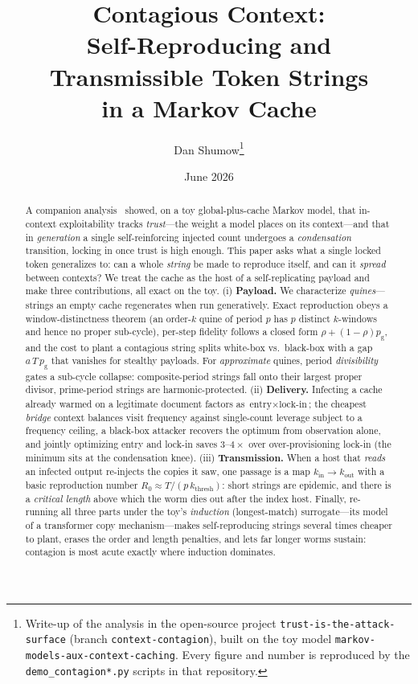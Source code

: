 \documentclass[11pt]{article}
\title{\bfseries Contagious Context:\\[2pt]
Self-Reproducing and Transmissible Token Strings\\
in a Markov Cache}
\author{Dan Shumow\thanks{Write-up of the analysis in the open-source project
\texttt{trust-is-the-attack-surface} (branch \texttt{context-contagion}), built on the toy
model \texttt{markov-models-aux-context-caching}. Every figure and number is reproduced by
the \texttt{demo\_contagion*.py} scripts in that repository.}}
\date{June 2026}
\theoremstyle{plain}
\theoremstyle{definition}
\theoremstyle{remark}
\newcommand{\pg}{p_{\text{g}}}
\newcommand{\Rzero}{R_{0}}
\begin{document}
\maketitle

\begin{abstract}
A companion analysis~\cite{shumow2026trust} showed, on a toy global-plus-cache Markov
model, that in-context exploitability tracks \emph{trust}---the weight a model places on its
context---and that in \emph{generation} a single self-reinforcing injected count undergoes a
\emph{condensation} transition, locking in once trust is high enough. This paper asks what a
single locked token generalizes to: can a whole \emph{string} be made to reproduce itself,
and can it \emph{spread} between contexts? We treat the cache as the host of a self-replicating
payload and make three contributions, all exact on the toy. (i) \textbf{Payload.} We
characterize \emph{quines}---strings an empty cache regenerates when run generatively. Exact
reproduction obeys a window-distinctness theorem (an order-$k$ quine of period $p$ has $p$
distinct $k$-windows and hence no proper sub-cycle), per-step fidelity follows a closed form
$\rho+(1-\rho)\pg$, and the cost to plant a contagious string splits white-box vs.\ black-box
with a gap $a\,T\,\pg$ that vanishes for stealthy payloads. For \emph{approximate} quines,
period \emph{divisibility} gates a sub-cycle collapse: composite-period strings fall onto
their largest proper divisor, prime-period strings are harmonic-protected. (ii)
\textbf{Delivery.} Infecting a cache already warmed on a legitimate document factors as
$\text{entry}\times\text{lock-in}$; the cheapest \emph{bridge} context balances visit
frequency against single-count leverage subject to a frequency ceiling, a black-box attacker
recovers the optimum from observation alone, and jointly optimizing entry and lock-in saves
$3$--$4\times$ over over-provisioning lock-in (the minimum sits at the condensation knee).
(iii) \textbf{Transmission.} When a host that \emph{reads} an infected output re-injects the
copies it saw, one passage is a map $k_{\text{in}}\!\to\!k_{\text{out}}$ with a basic
reproduction number $\Rzero\!\approx\!T/(p\,k_{\text{thresh}})$: short strings are epidemic,
and there is a \emph{critical length} above which the worm dies out after the index host.
Finally, re-running all three parts under the toy's \emph{induction} (longest-match)
surrogate---its model of a transformer copy mechanism---makes self-reproducing strings several
times cheaper to plant, erases the order and length penalties, and lets far longer worms
sustain: contagion is most acute exactly where induction dominates.
\end{abstract}
\end{document}
